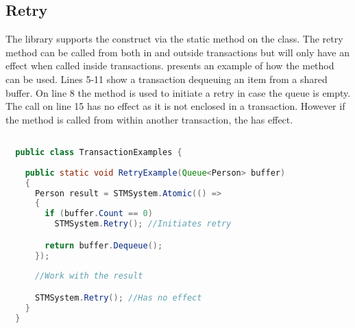 \subsection{Retry}\label{subsec:impl_retry}
The library supports the  construct via the static  method on the  class. The retry method can be called from both in and outside transactions but will only have an effect when called inside transactions.  presents an example of how the  method can be used. Lines 5-11 show a transaction dequeuing an item from a shared buffer. On line 8 the  method is used to initiate a retry in case the queue is empty. The call on line 15 has no effect as it is not enclosed in a transaction. However if the  method is called from within another transaction, the  has effect.

\begin{lstlisting}[float,label=lst:library_retry,
  caption={Library \bscode{Retry}},
  language=Java,  
  showspaces=false,
  showtabs=false,
  breaklines=true,
  showstringspaces=false,
  breakatwhitespace=true,
  commentstyle=\color{greencomments},
  keywordstyle=\color{bluekeywords},
  stringstyle=\color{redstrings},
  morekeywords={atomic, retry, orElse, var, get, set}]  % Start your code-block

  public class TransactionExamples {
    
    public static void RetryExample(Queue<Person> buffer)
    {
      Person result = STMSystem.Atomic(() =>
      {
        if (buffer.Count == 0)
          STMSystem.Retry(); //Initiates retry

        return buffer.Dequeue();
      });
      
      //Work with the result

      STMSystem.Retry(); //Has no effect
    }
  }
\end{lstlisting}
